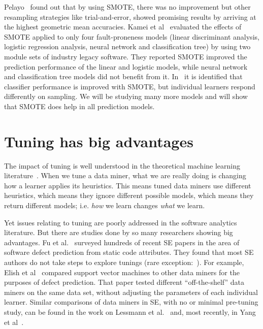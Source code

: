 \documentclass[sigconf]{acmart}
\theoremstyle{break}
\begin{document}
Pelayo~\cite{pelayo2007applying} found out that by using SMOTE, there was no improvement but other resampling strategies like trial-and-error, showed promising results by arriving at the highest geometric mean accuracies. Kamei et al~\cite{kamei2007effects} evaluated the effects of SMOTE applied to only four fault-proneness models
(linear discriminant analysis, logistic regression
analysis, neural network and classification tree) by
using two module sets of industry legacy software. They reported SMOTE improved the prediction performance of the linear and logistic models, while neural network and classification tree models did not
benefit from it. In~\cite{van2007experimental} it is identified that classifier performance is improved with SMOTE, but individual learners respond differently on sampling. We will be studying many more models and will show that SMOTE does help in all prediction models.

\section{Tuning has big advantages}
\label{sect:tune}

The impact of tuning is well understood in the theoretical machine learning literature~\cite{bergstra2012random}.  When we tune a
data miner, what we are really doing is changing how a learner applies its
heuristics. This means tuned data miners use different heuristics, which means
they ignore different possible models, which means they return different models;
i.e. \textit{how} we learn changes \textit{what} we learn.

Yet issues relating to
tuning are poorly addressed in the software analytics literature. But there are studies done by so many researchers showing big advantages. Fu et al.~\cite{fu2016tuning} surveyed hundreds of recent SE papers in the area
of software defect prediction from static code attributes. They found that most SE
  authors do not take steps to explore tunings (rare exception:~\cite{tantithamthavorn2016icse}). For example, Elish et
  al~\cite{elish2008predicting} compared support vector machines to other data
  miners for the purposes of defect prediction. That paper tested different
  ``off-the-shelf'' data miners on the same data set, without adjusting the
  parameters of each individual learner. Similar comparisons of data miners in SE,
with no or minimal pre-tuning study, can be found in the work on Lessmann et al.~\cite{4527256}
and, most recently, in Yang et al~\cite{Yang:2016}.  
\end{document}
